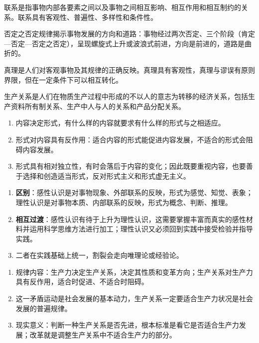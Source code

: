 

\da 联系是指事物内部各要素之间以及事物之间相互影响、相互作用和相互制约的关系。联系具有客观性、普遍性、多样性和条件性。

\da 否定之否定规律揭示事物发展的方向和道路：事物经过两次否定、三个阶段（肯定—否定—否定之否定），呈现螺旋式上升或波浪式前进，方向是前进的，道路是曲折的。

\da 真理是人们对客观事物及其规律的正确反映。真理具有客观性，真理与谬误有原则界限，但在一定条件下可以相互转化。

\da 生产关系是人们在物质生产过程中形成的不以人的意志为转移的经济关系，包括生产资料所有制关系、生产中人与人的关系和产品分配关系。


\yaodian
\begin{enumerate}[label=(\arabic*),leftmargin=2.2em,itemsep=2pt,topsep=2pt]
\item 内容决定形式，有什么样的内容就要求有什么样的形式与之相适应。
\item 形式对内容具有反作用：适合内容的形式能促进内容发展，不适合的形式会阻碍内容发展。
\item 形式具有相对独立性，有时会落后于内容的变化；因此既要重视内容，也要善于选择和创造适当形式，反对形式主义和形式虚无主义。
\end{enumerate}

\yaodian
\begin{enumerate}[label=(\arabic*),leftmargin=2.2em,itemsep=2pt,topsep=2pt]
\item \textbf{区别}：感性认识是对事物现象、外部联系的反映，形式为感觉、知觉、表象；理性认识是对事物本质、内部联系的反映，形式为概念、判断、推理。
\item \textbf{相互过渡}：感性认识有待于上升为理性认识，这需要掌握丰富而真实的感性材料并运用科学思维方法进行加工；理性认识又必须回到实践中接受检验并指导实践。
\item 二者在实践基础上统一，割裂会走向唯理论或经验论。
\end{enumerate}

\yaodian
\begin{enumerate}[label=(\arabic*),leftmargin=2.2em,itemsep=2pt,topsep=2pt]
\item 规律内容：生产力决定生产关系，决定其性质和变革方向；生产关系对生产力具有反作用，适合时促进、不适合时阻碍。
\item 这一矛盾运动是社会发展的基本动力，生产关系一定要适合生产力状况是社会发展的普遍规律。
\item 现实意义：判断一种生产关系是否先进，根本标准是看它是否适合生产力发展；改革就是调整生产关系中不适合生产力的部分。
\end{enumerate}

